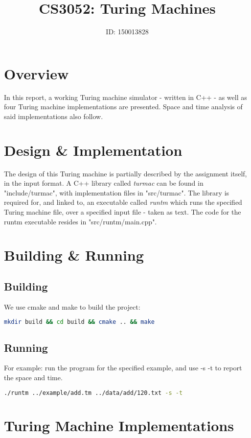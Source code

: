 \documentclass[]{article}
\title{CS3052: Turing Machines}
\author{ID: 150013828}
\begin{document}
\maketitle

\section{Overview}
In this report, a working Turing machine simulator - written in C++ - as well as four Turing machine implementations are presented. Space and time analysis of said implementations also follow.

\section{Design \& Implementation}
The design of this Turing machine is partially described by the assignment itself, in the input format. A C++ library called \emph{turmac} can be found in "include/turmac", with implementation files in "src/turmac". The library is required for, and linked to, an executable called \emph{runtm} which runs the specified Turing machine file, over a specified input file - taken as text. The code for the runtm executable resides in "src/runtm/main.cpp".

\section{Building \& Running}
\subsection{Building}
We use cmake and make to build the project:
\begin{lstlisting}[frame=single, language=bash]
mkdir build && cd build && cmake .. && make
\end{lstlisting}
\subsection{Running}
For example: run the program for the specified example, and use -s -t to report the space and time.
\begin{lstlisting}[frame=single,language=bash]
./runtm ../example/add.tm ../data/add/120.txt -s -t
\end{lstlisting}

\section{Turing Machine Implementations}
\end{document}
